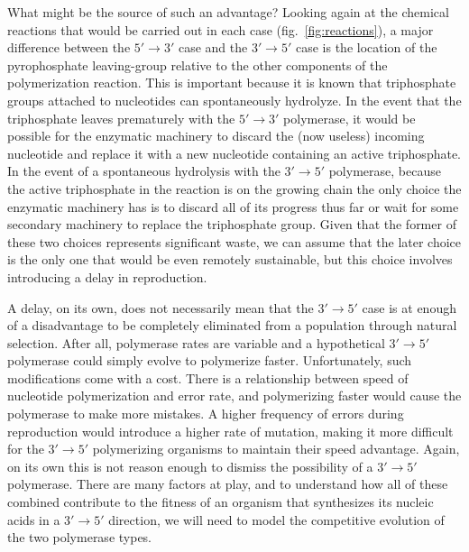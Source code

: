 What might be the source of such an advantage? Looking again at the chemical reactions that would be carried out in each case (fig.~\ref{fig:reactions}), a major difference between the $5'\to3'$ case and the $3'\to5'$ case is the location of the pyrophosphate leaving-group relative to the other components of the polymerization reaction. This is important because it is known that triphosphate groups attached to nucleotides can spontaneously hydrolyze\cite{Sigel:1983p720}. In the event that the triphosphate leaves prematurely with the $5'\to3'$ polymerase, it would be possible for the enzymatic machinery to discard the (now useless) incoming nucleotide and replace it with a new nucleotide containing an active triphosphate. In the event of a spontaneous hydrolysis with the $3'\to5'$ polymerase, because the active triphosphate in the reaction is on the growing chain the only choice the enzymatic machinery has is to discard all of its progress thus far or wait for some secondary machinery to replace the triphosphate group. Given that the former of these two choices represents significant waste, we can assume that the later choice is the only one that would be even remotely sustainable, but this choice involves introducing a delay in reproduction.

A delay, on its own, does not necessarily mean that the $3'\to5'$ case is at enough of a disadvantage to be completely eliminated from a population through natural selection. After all, polymerase rates are variable and a hypothetical $3'\to5'$ polymerase could simply evolve to polymerize faster. Unfortunately, such modifications come with a cost. There is a relationship between speed of nucleotide polymerization and error rate\cite{Griep:2006p719}, and polymerizing faster would cause the polymerase to make more mistakes. A higher frequency of errors during reproduction would introduce a higher rate of mutation, making it more difficult for the $3'\to5'$ polymerizing organisms to maintain their speed advantage. Again, on its own this is not reason enough to dismiss the possibility of a $3'\to5'$ polymerase. There are many factors at play, and to understand how all of these combined contribute to the fitness of an organism that synthesizes its nucleic acids in a $3'\to5'$ direction, we will need to model the competitive evolution of the two polymerase types.

